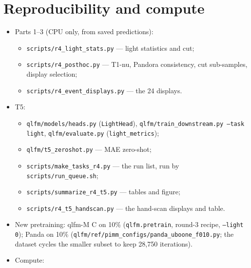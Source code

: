 \documentclass[11pt,a4paper]{article}
\newcommand{\code}[1]{\texttt{\small #1}}
\begin{document}
\section{Reproducibility and compute}
\sloppy
\begin{itemize}[leftmargin=*]
\item Parts 1--3 (CPU only, from saved predictions):
  \begin{itemize}
    \item \code{scripts/r4\_light\_stats.py} --- light statistics and cut;
    \item \code{scripts/r4\_posthoc.py} --- T1-nu, Pandora consistency, cut sub-samples, display selection;
    \item \code{scripts/r4\_event\_displays.py} --- the 24 displays.
  \end{itemize}
\item T5:
  \begin{itemize}
    \item \code{qlfm/models/heads.py} (\code{LightHead}), \code{qlfm/train\_downstream.py --task light}, \code{qlfm/evaluate.py} (\code{light\_metrics});
    \item \code{qlfm/t5\_zeroshot.py} --- MAE zero-shot;
    \item \code{scripts/make\_tasks\_r4.py} --- the run list, run by \code{scripts/run\_queue.sh};
    \item \code{scripts/summarize\_r4\_t5.py} --- tables and figure;
    \item \code{scripts/r4\_t5\_handscan.py} --- the hand-scan displays and table.
  \end{itemize}
\item New pretraining: qlfm-M C on 10\% (\code{qlfm.pretrain}, round-3 recipe, \code{--light 0}); Panda on 10\% (\code{qlfm/ref/pimm\_configs/panda\_uboone\_f010.py}; the dataset cycles the smaller subset to keep 28{,}750 iterations).
\item Compute: 
\end{itemize}

\appendix
\end{document}
